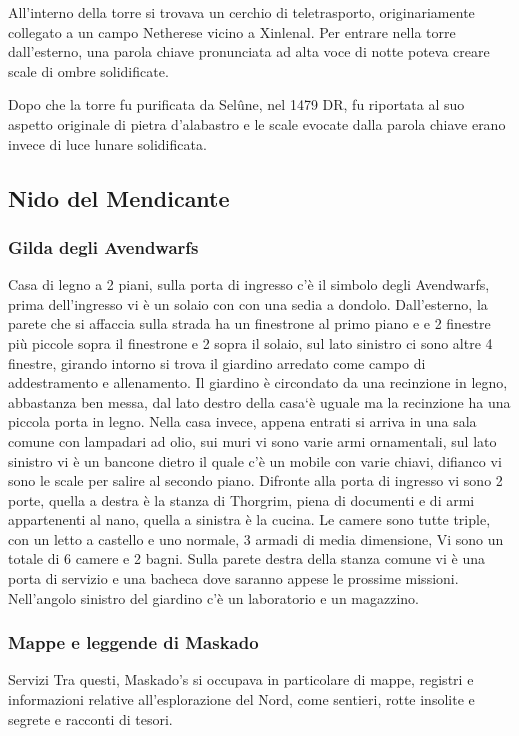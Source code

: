 \documentclass{article}
\begin{document}
All'interno della torre si trovava un cerchio di teletrasporto, originariamente collegato a un campo Netherese vicino a Xinlenal. Per entrare nella torre dall'esterno, una parola chiave pronunciata ad alta voce di notte poteva creare scale di ombre solidificate.

Dopo che la torre fu purificata da Selûne, nel 1479 DR, fu riportata al suo aspetto originale di pietra d'alabastro e le scale evocate dalla parola chiave erano invece di luce lunare solidificata.

          \subsection{Nido del Mendicante}
              \subsubsection{Gilda degli Avendwarfs}
Casa di legno a 2 piani, sulla porta di ingresso c'è il simbolo degli Avendwarfs, prima dell'ingresso vi è un solaio con con una sedia a dondolo. Dall'esterno, la parete che si affaccia sulla strada ha un finestrone al primo piano e e 2 finestre più piccole sopra il finestrone e 2 sopra il solaio, sul lato sinistro ci sono altre 4 finestre, girando intorno si trova il giardino arredato come campo di addestramento e allenamento. Il giardino è circondato da una recinzione in legno, abbastanza ben messa, dal lato destro della casa`è uguale ma la recinzione ha una piccola porta in legno. Nella casa invece, appena entrati si arriva in una sala comune con lampadari ad olio, sui muri vi sono varie armi ornamentali, sul lato sinistro vi è un bancone dietro il quale c'è un mobile con varie chiavi, difianco vi sono le scale per salire al secondo piano. Difronte alla porta di ingresso vi sono 2 porte, quella a destra è la stanza di Thorgrim, piena di documenti e di armi appartenenti al nano, quella a sinistra è la cucina. Le camere sono tutte triple, con un letto a castello e uno normale, 3 armadi di media dimensione, Vi sono un totale di 6 camere e 2 bagni. Sulla parete destra della stanza comune vi è una porta di servizio e una bacheca dove saranno appese le prossime missioni. Nell'angolo sinistro del giardino c'è un laboratorio e un magazzino. 
              \subsubsection{Mappe e leggende di Maskado}
Servizi\newline
Tra questi, Maskado's si occupava in particolare di mappe, registri e informazioni relative all'esplorazione del Nord, come sentieri, rotte insolite e segrete e racconti di tesori.
\end{document}
